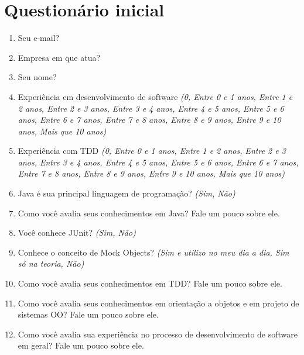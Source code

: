\chapter{Questionário inicial}
\label{ape:questionario-inicio}

\begin{enumerate}

\item Seu e-mail?

\item Empresa em que atua?

\item Seu nome?

\item Experiência em desenvolvimento de software \textit{(0, Entre 0 e 1 anos, Entre 1 e 2 anos, Entre 2 e 3 anos, Entre 3 e 4 anos, Entre 4 e 5 anos, Entre 5 e 6 anos, Entre 6 e 7 anos, Entre 7 e 8 anos, Entre 8 e 9 anos, Entre 9 e 10 anos, Mais que 10 anos)}

\item Experiência com TDD \textit{(0, Entre 0 e 1 anos, Entre 1 e 2 anos, Entre 2 e 3 anos, Entre 3 e 4 anos, Entre 4 e 5 anos, Entre 5 e 6 anos, Entre 6 e 7 anos, Entre 7 e 8 anos, Entre 8 e 9 anos, Entre 9 e 10 anos, Mais que 10 anos)}

\item Java é sua principal linguagem de programação? \textit{(Sim, Não)}

\item Como você avalia seus conhecimentos em Java? Fale um pouco sobre ele.	

\item Você conhece JUnit? \textit{(Sim, Não)}

\item Conhece o conceito de Mock Objects? \textit{(Sim e utilizo no meu dia a dia, Sim só na teoria, Não)}

\item Como você avalia seus conhecimentos em TDD? Fale um pouco sobre ele.	

\item Como você avalia seus conhecimentos em orientação a objetos e em projeto de sistemas OO? Fale um pouco sobre ele.	

\item Como você avalia sua experiência no processo de desenvolvimento de software em geral? Fale um pouco sobre ele.	

\end{enumerate}